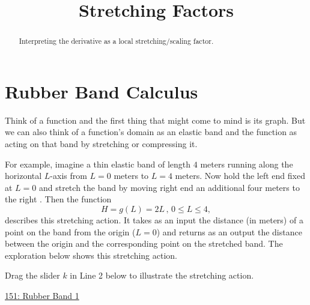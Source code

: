 \documentclass{ximera}
\title{Stretching Factors}
\begin{document}
\begin{abstract}
Interpreting the derivative as a local stretching/scaling factor.
\end{abstract}
\maketitle

\section{Rubber Band Calculus}

Think of a function and the first thing that might come to mind is its graph. But we can also think of a function's domain as an elastic band and the function as acting on that band by stretching or compressing it. %

For example, imagine a thin elastic band of length $4$ meters running along the horizontal $L$-axis from $L=0$ meters to $L=4$ meters.  Now hold the left end fixed at $L=0$ and stretch the band by moving right end an additional four meters to the right . Then the function
\[
      H = g(L) = 2L \, , \, 0\leq L \leq 4 ,
\]
describes this stretching action. It takes as an input the distance (in meters) of a point on the band from the origin ($L=0$) and returns as an output the distance between the origin and the corresponding point on the stretched band. The exploration below shows this stretching action.

\begin{exploration} \label{Ex:98f3rgafgbb}
Drag the slider $k$ in Line 2 below to illustrate the stretching action.

\begin{onlineOnly}
    \begin{center}
\end{center}
\end{onlineOnly}

\href{https://www.desmos.com/calculator/qejivz36ui}{151: Rubber Band 1}

\end{exploration}
\end{document}
